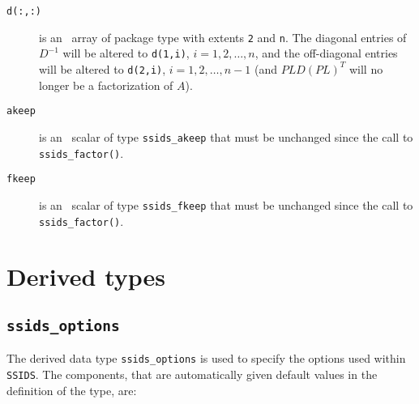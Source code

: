 \begin{description}

\item[\texttt{d(:,:)}] is an \intentin\ array of package type with
extents {\tt 2}  and {\tt n}. The diagonal entries
of ${D}^{-1}$ will be altered to {\tt d(1,i)}, $i = 1,2,\ldots,n$,
and the off-diagonal entries will be altered to
{\tt d(2,i)}, $i = 1,2,\ldots,n-1$ (and $PLD(PL)^T$ will no longer be
a factorization of $A$).

\item[\texttt{akeep}]  is an \intentin\ scalar of type {\tt ssids\_akeep} that
must be unchanged since the call to {\tt ssids\_factor()}.

\item[\texttt{fkeep}]  is an \intentinout\ scalar of type {\tt ssids\_fkeep}
that must be unchanged since the call to {\tt ssids\_factor()}.

\end{description}


\section{Derived types}
\subsection{\texttt{ssids\_options}}
\label{typeoptions}

The derived data type {\tt ssids\_options} is used to specify the options used
within \texttt{SSIDS}. The components, that are automatically
given default values in the definition of the type, are: \\


